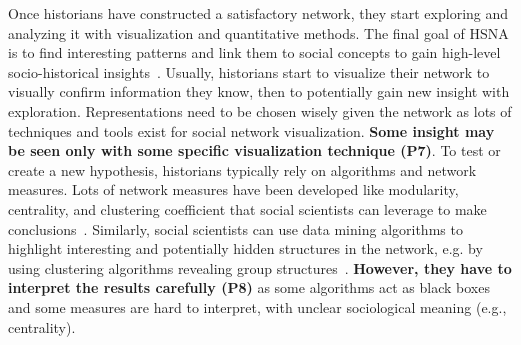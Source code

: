 Once historians have constructed a satisfactory network, they start exploring and analyzing it with visualization and quantitative methods.
The final goal of HSNA is to find interesting patterns and link them to social concepts to gain high-level socio-historical insights~\cite{freemanDevelopmentSocialNetwork2004, wetherellHistoricalSocialNetwork1998}.
Usually, historians start to visualize their network to visually confirm information they know, then to potentially gain new insight with exploration.
Representations need to be chosen wisely given the network as lots of techniques and tools exist for social network visualization. \textbf{Some insight may be seen only with some specific visualization technique (P7)}.
To test or create a new hypothesis, historians typically rely on algorithms and network measures.
Lots of network measures have been developed like modularity, centrality, and clustering coefficient that social scientists can leverage to make conclusions~\cite{scottSocialNetworkAnalysis1988}.
Similarly, social scientists can use data mining algorithms to highlight interesting and potentially hidden structures in the network, e.g. by using clustering algorithms revealing group structures~\cite{brandesModularityClustering2008}.
\textbf{However, they have to interpret the results carefully (P8)} as some algorithms act as black boxes and some measures are hard to interpret, with unclear sociological meaning (e.g., centrality).
